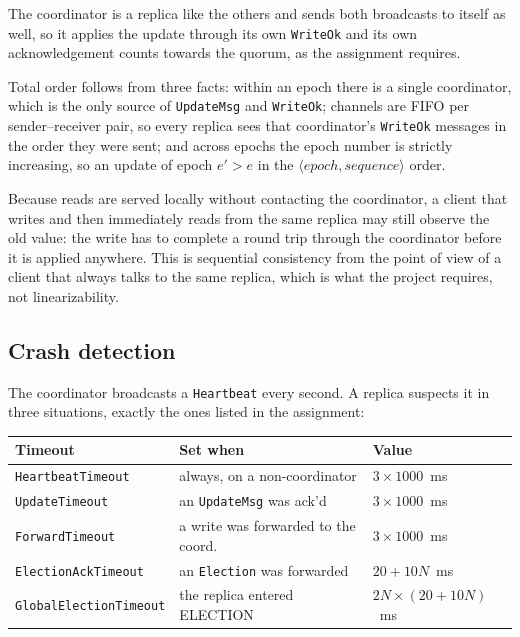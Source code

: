 The coordinator is a replica like the others and sends both broadcasts to itself as well, so it applies the update through its own \texttt{WriteOk} and its own acknowledgement counts towards the quorum, as the assignment requires.

Total order follows from three facts: within an epoch there is a single coordinator, which is the only source of \texttt{UpdateMsg} and \texttt{WriteOk}; channels are FIFO per sender--receiver pair, so every replica sees that coordinator's \texttt{WriteOk} messages in the order they were sent; and across epochs the epoch number is strictly increasing, so an update of epoch $e' > e$ in the $\langle epoch, sequence \rangle$ order.

Because reads are served locally without contacting the coordinator, a client that writes and then immediately reads from the same replica may still observe the old value: the write has to complete a round trip through the coordinator before it is applied anywhere. This is sequential consistency from the point of view of a client that always talks to the same replica, which is what the project requires, not linearizability.

\subsection*{Crash detection}

The coordinator broadcasts a \texttt{Heartbeat} every second. A replica suspects it in three situations, exactly the ones listed in the assignment:

\begin{center}
  \begin{tabular}{l l l}
    \textbf{Timeout} & \textbf{Set when} & \textbf{Value} \\
    \hline
    \texttt{HeartbeatTimeout}    & always, on a non-coordinator          & $3 \times 1000$~ms \\
    \texttt{UpdateTimeout}       & an \texttt{UpdateMsg} was ack'd       & $3 \times 1000$~ms \\
    \texttt{ForwardTimeout}      & a write was forwarded to the coord.   & $3 \times 1000$~ms \\
    \texttt{ElectionAckTimeout}  & an \texttt{Election} was forwarded    & $20 + 10N$~ms \\
    \texttt{GlobalElectionTimeout} & the replica entered ELECTION        & $2N \times (20 + 10N)$~ms \\
  \end{tabular}
\end{center}

